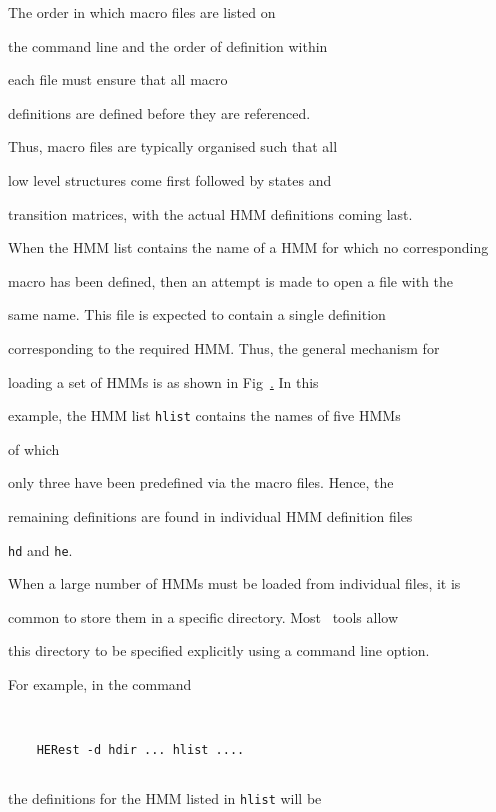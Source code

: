 The order in which macro files are listed on


the command line and the order of definition within


each file must ensure that all macro


definitions are defined before they are referenced.


Thus, macro files are typically organised such that all


low level structures come first followed by states and


transition matrices, with the actual HMM definitions coming last.








When the HMM list contains the name of a HMM for which no corresponding


macro has been defined, then an attempt is made to open a file with the


same name.  This file is expected to contain a single definition 


corresponding to the required HMM.  Thus, the general mechanism for


loading a set of HMMs is as shown in Fig~\href{f:hsetdef}.  In this


example, the HMM list \texttt{hlist} contains the names of five HMMs 


of which


only three have been predefined via the macro files.  Hence, the


remaining definitions are found in individual HMM definition files


\texttt{hd} and \texttt{he}.





When a large number of HMMs must be loaded from individual files, it is


common to store them in a specific directory.  Most \HTK\ tools allow


this directory to be specified explicitly using a command line option.


For example, in the command


\begin{verbatim}


    HERest -d hdir ... hlist ....


\end{verbatim}


the definitions for the HMM listed in \texttt{hlist} will be



